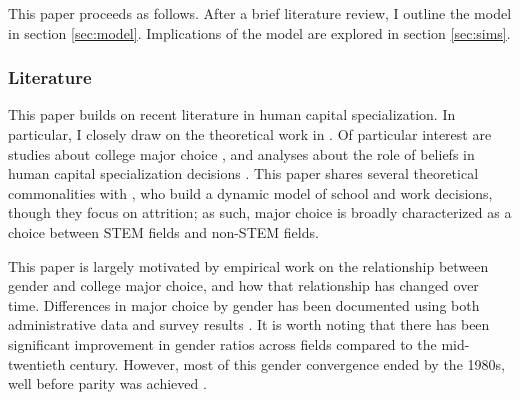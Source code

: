 \documentclass[10 pt]{article}
\begin{document}
This paper proceeds as follows. After a brief literature review, I outline the model in section \ref{sec:model}. Implications of the model are explored in section \ref{sec:sims}. 

\subsubsection*{Literature}

This paper builds on recent literature in human capital specialization.
In particular, I closely draw on the theoretical work in \textcite{AF20}.
Of particular interest are studies about college major choice \parencite{ABM12,AAM16-education}, and analyses about the role of beliefs in human capital specialization decisions \parencite{AHMR-wp}.
This paper shares several theoretical commonalities with \textcite{AAMR16-wp}, who build a dynamic model of school and work decisions, though they focus on attrition; as such, major choice is broadly characterized as a choice between STEM fields and non-STEM fields. 

This paper is largely motivated by empirical work on the relationship between gender and college major choice, and how that relationship has changed over time.
Differences in major choice by gender has been documented using both administrative data \parencite{D10} and survey results \parencite{Z13}.
It is worth noting that there has been significant improvement in gender ratios across fields compared to the mid-twentieth century.
However, most of this gender convergence ended by the 1980s, well before parity was achieved \parencite{SHB19,EL06}. 

\end{document}
